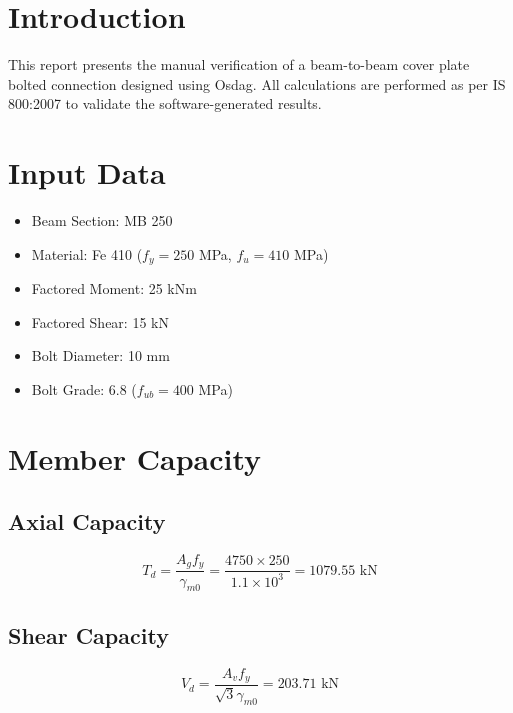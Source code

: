 




\maketitle

\section{Introduction}
This report presents the manual verification of a beam-to-beam cover plate bolted connection designed using Osdag. All calculations are performed as per IS 800:2007 to validate the software-generated results.

\section{Input Data}
\begin{itemize}
    \item Beam Section: MB 250
    \item Material: Fe 410 ($f_y = 250$ MPa, $f_u = 410$ MPa)
    \item Factored Moment: 25 kNm
    \item Factored Shear: 15 kN
    \item Bolt Diameter: 10 mm
    \item Bolt Grade: 6.8 ($f_{ub} = 400$ MPa)
\end{itemize}

\section{Member Capacity}

\subsection{Axial Capacity}
\begin{equation}
T_d = \frac{A_g f_y}{\gamma_{m0}} = \frac{4750 \times 250}{1.1 \times 10^3} = 1079.55 \text{ kN}
\end{equation}

\subsection{Shear Capacity}
\begin{equation}
V_d = \frac{A_v f_y}{\sqrt{3} \gamma_{m0}} = 203.71 \text{ kN}
\end{equation}

